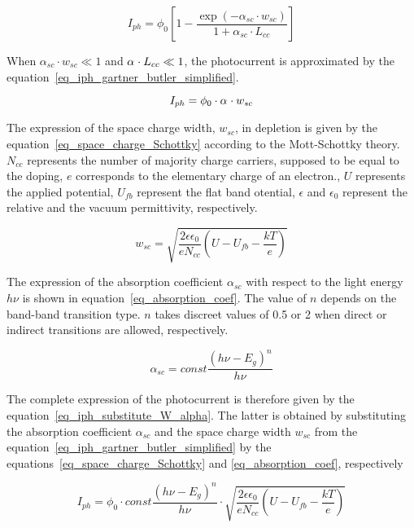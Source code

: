 \begin{equation}
    I_{ph} = \phi _0 \left[ 1 - \frac{\exp (-\alpha _{sc} \cdot w_{sc})}{1+\alpha _{sc} \cdot
    L_{cc}} \right]
    \label{eq_iph_gartner_butler}
\end{equation}

When $\alpha _{sc} \cdot w_{sc} \ll 1$ and $\alpha _{\sc} \cdot L_{cc} \ll 1$, 
the photocurrent is approximated by the 
equation~\ref{eq_iph_gartner_butler_simplified}.

\begin{equation}
    I_{ph} = \phi _0 \cdot \alpha _{\sc} \cdot w_{sc}
    \label{eq_iph_gartner_butler_simplified}
\end{equation}

The expression of the space charge width, $w_{sc}$, in depletion is given 
by the equation~\ref{eq_space_charge_Schottky} according to the Mott-Schottky theory. 
$N_{cc}$ represents the number of majority charge carriers, supposed to be 
equal to the doping, $e$ corresponds to the elementary charge of an electron., 
$U$ represents the applied potential, $U_{fb}$ represent the flat band 
otential, $\epsilon$ and $\epsilon _0$ represent the relative and the 
vacuum permittivity, respectively.

\begin{equation}
    w_{sc} = \sqrt{ \frac{2\epsilon \epsilon _0}{e N_{cc}} (U-U_{fb}-\frac{kT}{e}) }
    \label{eq_space_charge_Schottky}
\end{equation}

The expression of the absorption coefficient $\alpha _{sc}$ with respect to 
the light energy $h\nu$ is shown in equation~\ref{eq_absorption_coef}. 
The value of $n$ depends on the band-band transition type. $n$ takes discreet 
values of 0.5 or 2 when direct or indirect transitions are allowed, respectively.

\begin{equation}
    \alpha _{sc} = const \frac{(h\nu - E_g)^n}{h\nu}
    \label{eq_absorption_coef}
\end{equation}

The complete expression of the photocurrent is therefore given by the 
equation~\ref{eq_iph_substitute_W_alpha}. 
The latter is obtained by substituting the absorption coefficient $\alpha _{sc}$ 
and the space charge width $w_{sc}$ from the 
equation~\ref{eq_iph_gartner_butler_simplified}
by the equations~\ref{eq_space_charge_Schottky} and \ref{eq_absorption_coef}, 
respectively

\begin{equation}
    I_{ph} = \phi _0 \cdot const \frac{(h\nu - E_g)^n}{h\nu}
        \cdot \sqrt{ \frac{2\epsilon \epsilon _0}{e N_{cc}} (U-U_{fb}-\frac{kT}{e}) }
    \label{eq_iph_substitute_W_alpha}
\end{equation}

